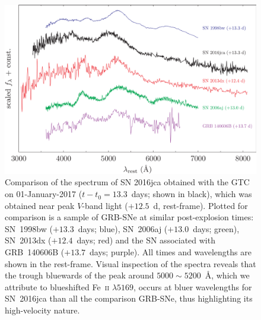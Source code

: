 \documentclass[traditabstract,longauth]{aa}
\begin{document}









\begin{figure}
   \includegraphics[width=\columnwidth]{Fig8_2016jca_SN_spectra_compare-eps-converted-to.pdf}
      \caption{Comparison of the spectrum of SN 2016jca obtained with the GTC on 01-January-2017 ($t-t_0 = 13.3$~days; shown in black), which was obtained near peak $V$-band light ($+12.5$~d, rest-frame).  Plotted for comparison is a sample of GRB-SNe at similar post-explosion times: SN~1998bw ($+13.3$~days; blue), SN~2006aj ($+13.0$~days; green), SN~2013dx ($+12.4$~days; red) and the SN associated with GRB~140606B ($+13.7$~days; purple).  All times and wavelengths are shown in the rest-frame.  Visual inspection of the spectra reveals that the trough bluewards of the peak around $5000\sim5200$~\AA, which we attribute to blueshifted Fe~\textsc{ii} $\lambda5169$, occurs at bluer wavelengths for SN~2016jca than all the comparison GRB-SNe, thus highlighting its high-velocity nature.}
   \label{Figspeccompare}
\end{figure}
\end{document}
